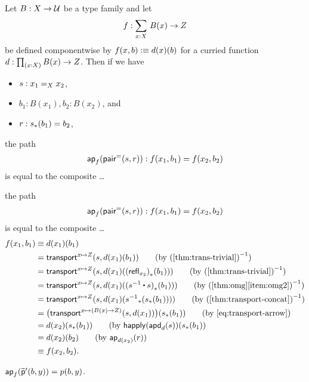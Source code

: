 \documentclass[centering]{report}
\newenvironment{slide}
    {\newpage
    \vspace*{\fill}
    }
    {
     \vspace*{\fill}
    }
\newcommand{\breakslide}{\vspace*{\fill}\newpage\vspace*{\fill}}
\begin{document}
\begin{slide}
\begin{lem}\label{thm:ap-sigma-rect-path-pair}
  Let $B:X\to\type$ be a type family and let
  \begin{align*}f:\sm{x:X} B(x) \to Z\end{align*}
  be defined componentwise by $f(x,b) \defeq d(x)(b)$ for a curried function $d:\prd{x:X} B(x)\to Z$.
  Then if we have
  \begin{itemize}
  \item $s:\id[X]{x_1}{x_2}$,
  \item $b_1:B(x_1), b_2:B(x_2)$, and
  \item $r:\trans{s}{b_1}=b_2$,
  \end{itemize}

 the path
  \begin{align*}
    \apfunc f (\pairpath(s,r)) :f(x_1,b_1) = f(x_2,b_2)
  \end{align*}
  is equal to the composite \dots

\breakslide

{\color{gray}
\everymath{\color{gray}}
the path
  \begin{align*}
    \apfunc f (\pairpath(s,r)) :f(x_1,b_1) = f(x_2,b_2)
  \end{align*}
  is equal to the composite \dots
}
{\LARGE
  \begin{align}
    f(x_1,b_1)
    &\jdeq d(x_1)(b_1) \notag\\
    &= \transfib{x\mapsto Z}{s}{d(x_1)(b_1)}
    \tag{by $\opp{\text{(\cref{thm:trans-trivial})}}$}\\
    &= \transfib{x\mapsto Z}{s}{d(x_1)(\trans{(\refl{x_2})}{b_1})}
    \tag{by $\opp{\text{(\cref{thm:trans-trivial})}}$}\\
    &= \transfib{x\mapsto Z}{s}{d(x_1)(\trans{(\opp s\ct s)}{b_1})}
    \tag{by $\opp{\text{(\cref{thm:omg}\ref{item:omg2})}}$}\\
    &= \transfib{x\mapsto Z}{s}{d(x_1)(\trans{\opp s}{\trans{s}{b_1}})}
    \tag{by $\opp{\text{(\cref{thm:transport-concat})}}$}\\
    &= \big(\transfib{x\mapsto (B(x)\to Z)}{s}{d(x_1)}\big)(\trans{s}{b_1})
    \tag{by~\eqref{eq:transport-arrow}}\\
    &= d(x_2)(\trans{s}{b_1})
    \tag{by $\happly(\apdfunc{d}(s))(\trans{s}{b_1}$}\\
    &= d(x_2)(b_2)
    \tag{by $\apfunc{d(x_2)}(r)$}\\
    &\jdeq f(x_2,b_2).
    \notag
  \end{align}
  }
\end{lem}
\vspace*{5mm}
\begin{lem}\label{thm:flattening-rectnd-beta-ppt}
  $\apfunc{f}(\ppt'(b,y)) = p(b,y)$.
\end{lem}
\end{slide}
\end{document}
